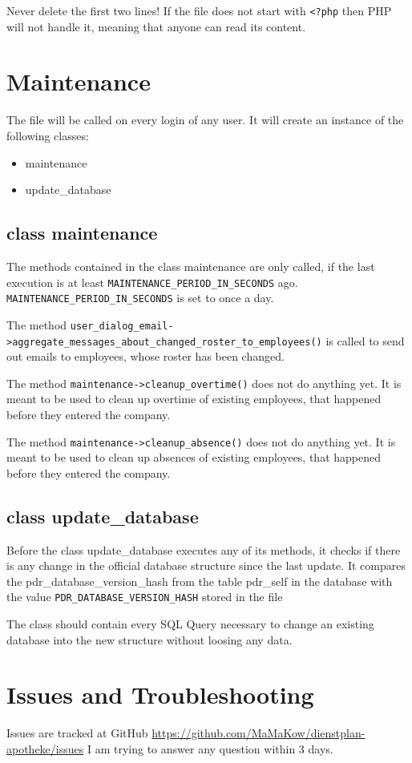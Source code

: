 Never delete the first two lines! If the file does not start with \lstinline|<?php| then PHP will not handle it, meaning that anyone can read its content. 

\section{Maintenance}
The file  will be called on every login of any user.
It will create an instance of the following classes:
\begin{itemize}
    \item maintenance
    \item update\_database
\end{itemize}

\subsection{class maintenance}
The methods contained in the class maintenance are only called, if the last execution is at least \lstinline|MAINTENANCE_PERIOD_IN_SECONDS| ago.
\lstinline|MAINTENANCE_PERIOD_IN_SECONDS| is set to once a day.

The method \lstinline|user_dialog_email->aggregate_messages_about_changed_roster_to_employees()| is called to send out emails to employees, whose roster has been changed.

The method \lstinline|maintenance->cleanup_overtime()| does not do anything yet. It is meant to be used to clean up overtime of existing employees, that happened before they entered the company.

The method \lstinline|maintenance->cleanup_absence()| does not do anything yet. It is meant to be used to clean up absences of existing employees, that happened before they entered the company.


\subsection{class update\_database}
Before the class update\_database executes any of its methods, it checks if there is any change in the official database structure since the last update.
It compares the pdr\_database\_version\_hash from the table pdr\_self in the database with the value \lstinline|PDR_DATABASE_VERSION_HASH| stored in the file 

The class should contain every SQL Query necessary to change an existing database into the new structure without loosing any data.


\section{Issues and Troubleshooting}
Issues are tracked at GitHub \url{https://github.com/MaMaKow/dienstplan-apotheke/issues}
I am trying to answer any question within 3 days.
